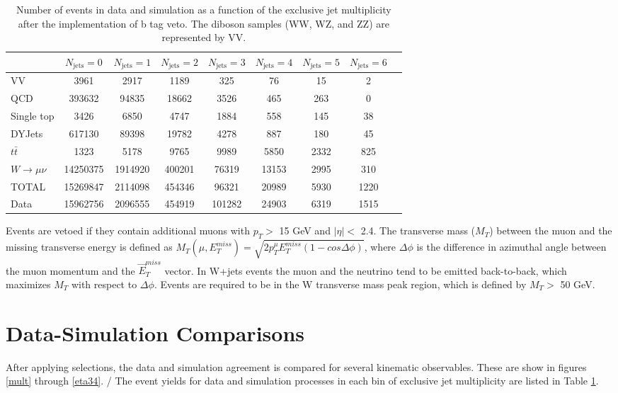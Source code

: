 \documentclass[oneside, letterpaper, oldfontcommands]{memoir}
\begin{document}
\begin{table}\small
\centering
\caption{Number of events in data and simulation as a function of the exclusive jet multiplicity after the implementation of b tag veto. The diboson samples (WW, WZ, and ZZ) are represented by VV.}
\begin{tabular}{l|cccccccc}
  &  $N_{\text{jets}} = 0 $ & $N_{\text{jets}} = 1 $ & $N_{\text{jets}} = 2 $ & $N_{\text{jets}} = 3 $ & $N_{\text{jets}} = 4 $ & $N_{\text{jets}} = 5 $ & $N_{\text{jets}} = 6 $ \\ \hline
   VV        & 3961 & 2917 & 1189 & 325 & 76 & 15 & 2 \\
   QCD        & 393632 & 94835 & 18662 & 3526 & 465 & 263 & 0 \\
   Single top        & 3426 & 6850 & 4747 & 1884 & 558 & 145 & 38 \\
   DYJets        & 617130 & 89398 & 19782 & 4278 & 887 & 180 & 45 \\
   $t\bar{t}$         & 1323 & 5178 & 9765 & 9989 & 5850 & 2332 & 825 \\
   $W \rightarrow \mu\nu$        & 14250375 & 1914920 & 400201 & 76319 & 13153 & 2995 & 310 \\
 \hline
 TOTAL & 15269847 & 2114098 & 454346 & 96321 & 20989 & 5930 & 1220 \\
 \hline
 Data          & 15962756 & 2096555 & 454919 & 101282 & 24903 & 6319 & 1515 \\
 \end{tabular}
 \label{tab:events}
 \end{table}

\qquad Events are vetoed if they contain additional muons with $p_{T} >$ 15 GeV and $|\eta| <$ 2.4. The transverse mass ($M_{T}$) between the muon and the missing transverse energy is defined as $M_{T}(\mu,E_{T}^{miss}) = \sqrt{2 p_{T}^{\mu} E_{T}^{miss} (1-cos\Delta\phi)}$, where $\Delta\phi$ is the difference in azimuthal angle between the muon momentum and the $\vec{E}_{T}^{miss}$ vector. In W+jets events the muon and the neutrino tend to be emitted back-to-back, which maximizes $M_{T}$ with respect to $\Delta\phi$. Events are required to be in the W transverse mass peak region, which is defined by $M_{T} >$ 50 GeV.

\section{Data-Simulation Comparisons}
\qquad After applying selections, the data and simulation agreement is compared for several kinematic observables. These are show in figures \ref{mult} through \ref{eta34}.
/
\qquad The event yields for data and simulation processes in each bin of exclusive jet multiplicity are listed in Table \ref{tab:events}.
\end{document}
